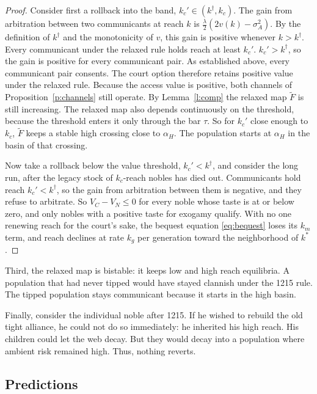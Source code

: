 \documentclass[12pt]{article}
\theoremstyle{definition}
\theoremstyle{remark}
\begin{document}
\begin{proof}
Consider first a rollback into the band, $k_c'\in(k^\dagger,k_c)$. The gain from
arbitration between two communicants at reach $k$ is
$\tfrac{\lambda}{2}(2v(k)-\sigma^2_A)$. By the definition of $k^\dagger$ and
the monotonicity of $v$, this gain is positive whenever $k>k^\dagger$. Every
communicant under the relaxed rule holds reach at least $k_c'$.
$k_c'>k^\dagger$, so the gain is positive for every communicant pair. As
established above, every communicant pair consents. The court option
therefore retains positive value under the relaxed rule. Because the access
value is positive, both channels of Proposition~\ref{p:channels} still
operate. By Lemma~\ref{l:comp} the relaxed map $\tilde F$ is still
increasing. The relaxed map also depends continuously on the threshold,
because the threshold enters it only through the bar $\tau$. So for $k_c'$
close enough to $k_c$, $\tilde F$ keeps a stable high crossing close to
$\alpha_H$. The population starts at $\alpha_H$ in the basin of
that crossing.

Now take a rollback below the value threshold, $k_c'<k^\dagger$, and consider
the long run, after the legacy stock of $k_c$-reach nobles has died out.
Communicants hold reach $k_c'<k^\dagger$, so the gain from arbitration
between them is negative, and they refuse to arbitrate. So $V_C-V_N\le 0$ for every noble whose taste is at or below zero,
and only nobles with a positive taste for exogamy qualify. With
no one renewing reach for the court's sake, the bequest equation
\eqref{eq:bequest} loses its $k_m$ term, and reach declines at rate $k_g$ per
generation toward the neighborhood of $k^\ast$.
\end{proof}


Third, the relaxed map is bistable: it keeps low and high reach equilibria. A population that had never tipped would have stayed clannish under the 1215 rule. The tipped population stays communicant because it starts in the high basin.

Finally, consider the individual noble after 1215. If he wished to rebuild the old tight alliance, he could not do so immediately: he inherited his high reach. His children could let the web decay. But they would decay into a population where ambient risk remained high. Thus, nothing reverts.

\subsection{Predictions}
\end{document}

